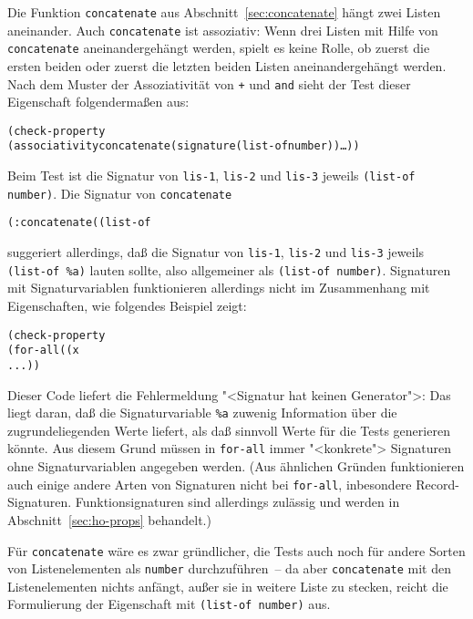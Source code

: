 Die Funktion
\texttt{concatenate} aus
Abschnitt~\ref{sec:concatenate} hängt zwei Listen aneinander.  Auch
\texttt{concatenate} ist assoziativ: Wenn drei Listen mit Hilfe von
\texttt{concatenate} aneinandergehängt werden, spielt es keine Rolle,
ob zuerst die ersten beiden oder zuerst die letzten beiden Listen
aneinandergehängt werden.  Nach dem Muster der Assoziativität von
\texttt{+} und \texttt{and} sieht der Test dieser Eigenschaft
folgendermaßen aus:
%
\begin{alltt}
(check-property
 (associativity concatenate (signature (list-of number)) \ldots))
\end{alltt}
%
Beim Test ist die Signatur von \texttt{lis-1}, \texttt{lis-2} und
\texttt{lis-3} jeweils \texttt{(list-of number)}.  Die Signatur von \texttt{concatenate}
%
\begin{alltt}
(: concatenate ((list-of %a) (list-of %a) -> (list-of %a)))
\end{alltt}
%
suggeriert allerdings, daß die Signatur von \texttt{lis-1},
\texttt{lis-2} und \texttt{lis-3} jeweils \texttt{(list-of \%a)} lauten
sollte, also allgemeiner als \texttt{(list-of number)}.  Signaturen mit
Signaturvariablen funktionieren allerdings nicht im Zusammenhang mit
Eigenschaften, wie folgendes Beispiel zeigt:
%
\begin{alltt}
(check-property
  (for-all ((x %a))
    ...))
\end{alltt}
%
Dieser Code liefert die Fehlermeldung "<Signatur hat keinen
Generator">: Das liegt daran, daß die Signaturvariable \texttt{\%a}
zuwenig Information über die zugrundeliegenden Werte liefert, als daß
\drscheme{} sinnvoll Werte für die Tests generieren könnte.  Aus diesem
Grund müssen in \texttt{for-all} immer "<konkrete"> Signaturen ohne
Signaturvariablen angegeben werden.  (Aus ähnlichen Gründen
funktionieren auch einige andere Arten von Signaturen nicht bei
\texttt{for-all}, inbesondere Record-Signaturen.  Funktionsignaturen sind
allerdings zulässig und werden in Abschnitt~\ref{sec:ho-props} behandelt.)

Für \texttt{concatenate} wäre es zwar gründlicher, die Tests auch noch
für andere Sorten von Listenelementen als \texttt{number}
durchzuführen~-- da aber \texttt{concatenate} mit den Listenelementen
nichts anfängt, außer sie in weitere Liste zu stecken, reicht die
Formulierung der Eigenschaft mit \texttt{(list-of number)} aus.

